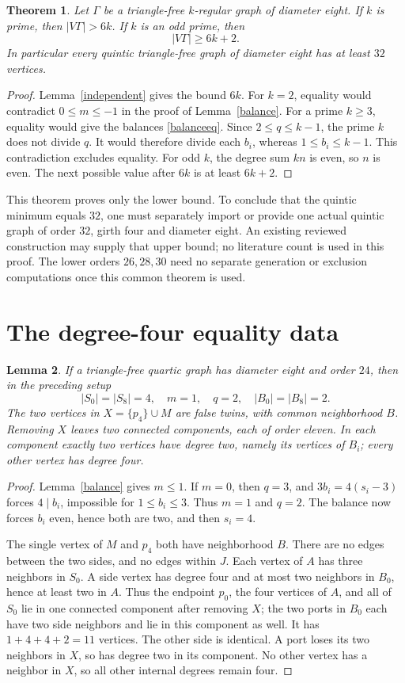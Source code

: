 \documentclass[11pt]{article}
\newtheorem{theorem}{Theorem}[section]
\newtheorem{lemma}[theorem]{Lemma}
\begin{document}
\begin{theorem}\label{prime}
Let $\Gamma$ be a triangle-free $k$-regular graph of diameter eight.
If $k$ is prime, then $|V\Gamma|>6k$. If $k$ is an odd prime, then
\[
 |V\Gamma|\geq6k+2.
\]
In particular every quintic triangle-free graph of diameter eight
has at least $32$ vertices.
\end{theorem}
\begin{proof}
Lemma~\ref{independent} gives the bound $6k$. For $k=2$, equality
would contradict $0\leq m\leq-1$ in the proof of Lemma~\ref{balance}.
For a prime $k\geq3$, equality would give the balances
\eqref{balanceeq}. Since $2\leq q\leq k-1$, the prime $k$ does not
divide $q$. It would therefore divide each $b_i$, whereas
$1\leq b_i\leq k-1$. This contradiction excludes equality.
For odd $k$, the degree sum $kn$ is even, so $n$ is even. The next
possible value after $6k$ is at least $6k+2$.
\end{proof}

This theorem proves only the lower bound. To conclude that the quintic
minimum equals $32$, one must separately import or provide one actual
quintic graph of order $32$, girth four and diameter eight. An existing
reviewed construction may supply that upper bound; no literature count
is used in this proof. The lower orders $26,28,30$ need no separate
generation or exclusion computations once this common theorem is used.

\section{The degree-four equality data}

\begin{lemma}\label{fourdata}
If a triangle-free quartic graph has diameter eight and order $24$,
then in the preceding setup
\[
 |S_0|=|S_8|=4,\quad m=1,\quad q=2,\quad |B_0|=|B_8|=2.
\]
The two vertices in $X=\{p_4\}\cup M$ are false twins, with common
neighborhood $B$. Removing $X$ leaves two connected components, each
of order eleven. In each component exactly two vertices have degree
two, namely its vertices of $B_i$; every other vertex has degree four.
\end{lemma}
\begin{proof}
Lemma~\ref{balance} gives $m\leq1$. If $m=0$, then $q=3$, and
$3b_i=4(s_i-3)$ forces $4\mid b_i$, impossible for
$1\leq b_i\leq3$. Thus $m=1$ and $q=2$. The balance now forces
$b_i$ even, hence both are two, and then $s_i=4$.

The single vertex of $M$ and $p_4$ both have neighborhood $B$. There
are no edges between the two sides, and no edges within $J$. Each
vertex of $A$ has three neighbors in $S_0$. A side vertex has degree
four and at most two neighbors in $B_0$, hence at least two in $A$.
Thus the endpoint $p_0$, the four vertices of $A$, and all of $S_0$
lie in one connected component after removing $X$; the two ports in
$B_0$ each have two side neighbors and lie in this component as well.
It has $1+4+4+2=11$ vertices. The other side is identical. A port
loses its two neighbors in $X$, so has degree two in its component.
No other vertex has a neighbor in $X$, so all other internal degrees
remain four.
\end{proof}
\end{document}
